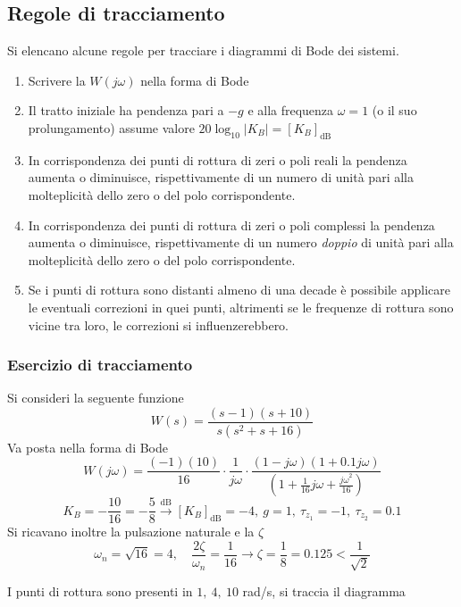 \newpage
\subsection{Regole di tracciamento}
Si elencano alcune regole per tracciare i diagrammi di Bode dei sistemi.
\begin{enumerate}
\item Scrivere la $W(j\omega)$ nella forma di Bode
\item Il tratto iniziale ha pendenza pari a $-g$ e alla frequenza $\omega=1$ (o
il suo prolungamento) assume valore $20\log_{10}|K_B| = [K_B]_{\si{\deci\bel}}$
\item In corrispondenza dei punti di rottura di zeri o poli reali la pendenza
aumenta o diminuisce, rispettivamente di un numero di unità pari alla
molteplicità dello zero o del polo corrispondente.
\item In corrispondenza dei punti di rottura di zeri o poli complessi la
pendenza
aumenta o diminuisce, rispettivamente di un numero \textit{doppio} di unità
pari alla
molteplicità dello zero o del polo corrispondente.
\item Se i punti di rottura sono distanti almeno di una decade è possibile
applicare le eventuali correzioni in quei punti, altrimenti se le frequenze di
rottura sono vicine tra loro, le correzioni si influenzerebbero.
\end{enumerate}

\newpage
\subsubsection{Esercizio di tracciamento}
\label{sec:Esercizio_bode}
Si consideri la seguente funzione
$$
W(s) = \frac{(s-1)(s+10)}{s(s^2+s+16)}
$$
Va posta nella forma di Bode
$$
W(j\omega) = \frac{(-1)(10)}{16} \cdot \frac{1}{{j\omega}}\cdot
\frac{(1-{j\omega})(1+0.1{j\omega})
}{\left( 1+\frac{1}{16}{j\omega} + \frac{{j\omega}^2}{16} \right)}
$$
$$
K_B = -\frac{10}{16} = -\frac{5}{8} \stackrel{\si{\deci\bel}}{\longrightarrow}
[K_B]_{\si{\deci\bel}} = -4,\ g=1,\ \tau_{z_1} = -1,\ \tau_{z_2} = 0.1
$$
Si ricavano inoltre la pulsazione naturale e la $\zeta$
$$
\omega_n = \sqrt{16} = 4,\quad \frac{2\zeta}{\omega_n} = \frac{1}{16}
\longrightarrow \zeta= \frac{1}{8} = 0.125 < \frac{1}{\sqrt{2}}
$$


I punti di rottura sono presenti in $1,\ 4,\ 10$ \si{\radian/\second},
si traccia il diagramma
\begin{figure}[h]
\centering
{}
\end{figure}

